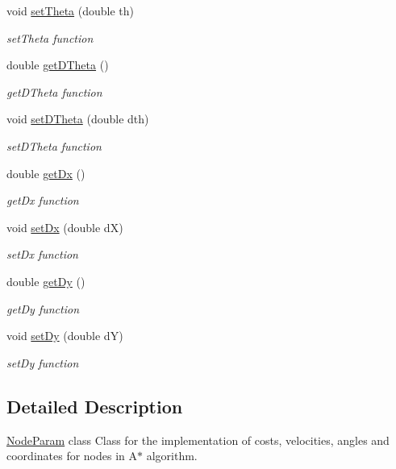 \begin{DoxyCompactItemize}
void \hyperlink{class_node_param_ae72c374809beb88a2ac395584135d009}{set\+Theta} (double th)
\begin{DoxyCompactList}\small\item\em set\+Theta function \end{DoxyCompactList}\item 
double \hyperlink{class_node_param_a9ae847d012e6a33d390eb468cb5c3e83}{get\+D\+Theta} ()
\begin{DoxyCompactList}\small\item\em get\+D\+Theta function \end{DoxyCompactList}\item 
void \hyperlink{class_node_param_a501fb82083ddc6b2c3edd84694cc0bae}{set\+D\+Theta} (double dth)
\begin{DoxyCompactList}\small\item\em set\+D\+Theta function \end{DoxyCompactList}\item 
double \hyperlink{class_node_param_a2c1d2ef1833a0c4697d1a3a8c21a29e0}{get\+Dx} ()
\begin{DoxyCompactList}\small\item\em get\+Dx function \end{DoxyCompactList}\item 
void \hyperlink{class_node_param_a9842fb657d570474338bf798cd9851b4}{set\+Dx} (double dX)
\begin{DoxyCompactList}\small\item\em set\+Dx function \end{DoxyCompactList}\item 
double \hyperlink{class_node_param_ace7de13cf60fa1037d8891e9ab484587}{get\+Dy} ()
\begin{DoxyCompactList}\small\item\em get\+Dy function \end{DoxyCompactList}\item 
void \hyperlink{class_node_param_a15ae6e0cab9b1b72e20d4c7bafc19de8}{set\+Dy} (double dY)
\begin{DoxyCompactList}\small\item\em set\+Dy function \end{DoxyCompactList}\end{DoxyCompactItemize}


\subsection{Detailed Description}
\hyperlink{class_node_param}{Node\+Param} class Class for the implementation of costs, velocities, angles and coordinates for nodes in A$\ast$ algorithm. 

